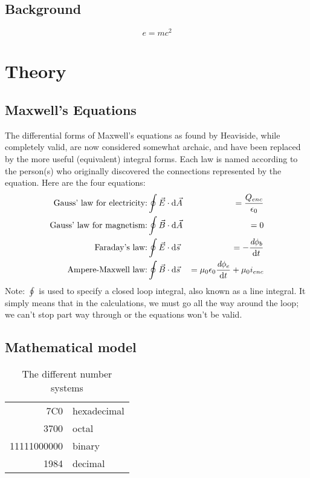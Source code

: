 \documentclass[%
]{USN-MSc}
\begin{document}
\section{Background}
\label{sec:back}
\lipsum[4]
\begin{equation}
  e = m c^2
\end{equation}
\lipsum

\chapter{Theory}
\label{ch:theory}

\section{Maxwell's Equations}
\label{sec:theory}
\indent The differential forms of Maxwell's equations as found by Heaviside, while completely valid, are now considered somewhat archaic, and have been replaced by the more useful (equivalent) integral forms. Each law is named according to the person(s) who originally discovered the connections represented by the equation. Here are the four equations:
\begin{eqnarray}
  \text{Gauss' law for electricity:}& \displaystyle \oint{\vec{E}\cdot\mathrm{d}\vec{A}}&=\frac{Q_{enc}}{\epsilon_0}\\
  \text{Gauss' law for magnetism:}& \displaystyle \oint{\vec{B}\cdot\mathrm{d}\vec{A}}&=0\\
  \text{Faraday's law:}& \displaystyle\oint{\vec{E}\cdot\mathrm{d}\vec{s}}&=-\frac{\emph{d}\phi_b}{\mathrm{d}t}\\
  \text{Ampere-Maxwell law:}& \displaystyle\oint{\vec{B}\cdot\mathrm{d}\vec{s}}&=\mu_0\epsilon_0\frac{\emph{d}\phi_e}{\mathrm{d}t}+\mu_0 i_{enc}
\end{eqnarray}
Note: $\oint$ is used to specify a closed loop integral, also known as a line integral. It simply means that in the calculations, we must go all the way around the loop; we can't stop part way through or the equations won't be valid.

\section{Mathematical model}
\label{sec:mathmodel}
\lipsum[8]
\begin{table}[!ht]
  \caption{The different number systems}
  \centering
  \begin{tabular}{|r|l|}
    \hline
    7C0 & hexadecimal \\
    3700 & octal \\ \cline{2-2}
    11111000000 & binary \\
    \hline \hline
    1984 & decimal \\
    \hline
  \end{tabular}
\end{table}
\end{document}
